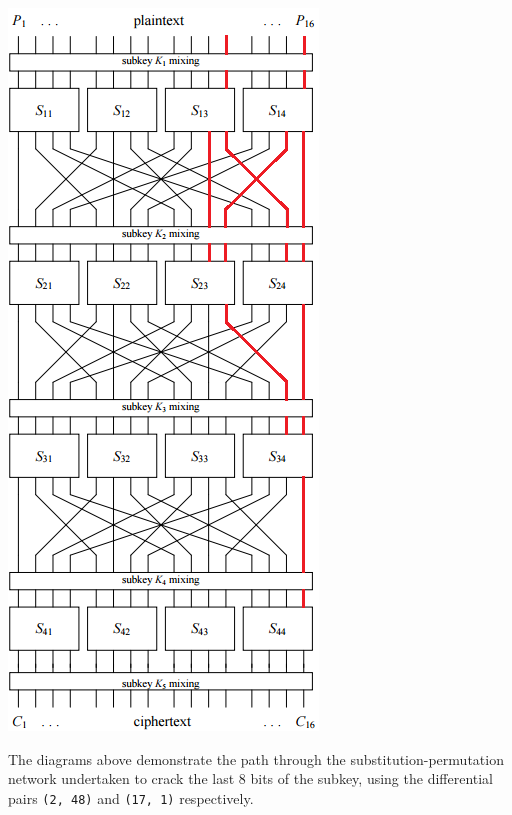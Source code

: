 \documentclass[british,10pt,a4paper]{article}
\begin{document}
\begin{appendices}
  \includegraphics{17,1}

  \hspace{1cm}
  The diagrams above demonstrate the path through the substitution-permutation network undertaken to crack the last 8 bits of the subkey, using the differential pairs \lstinline{(2, 48)} and \lstinline{(17, 1)} respectively.
  \clearpage

\end{appendices}
\clearpage
\end{document}
